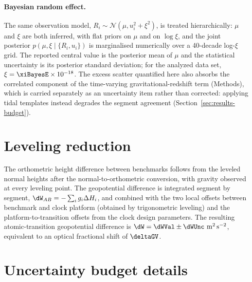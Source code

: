 \paragraph{Bayesian random effect.} The same observation model,
$R_i \sim \mathcal{N}(\mu, u_i^2 + \xi^2)$, is treated
hierarchically: $\mu$ and $\xi$ are both inferred, with flat priors
on $\mu$ and on $\log\xi$, and the joint posterior
$p(\mu, \xi \mid \{R_i, u_i\})$ is marginalised numerically over a
40-decade log-$\xi$ grid. The reported central value is the posterior
mean of $\mu$ and the statistical uncertainty is its posterior
standard deviation; for the analyzed data set,
$\xi = \xiBayesE \times 10^{-18}$. The excess scatter quantified here
also absorbs the correlated component of the time-varying
gravitational-redshift term (Methods), which
is carried separately as an uncertainty item rather than corrected:
applying tidal templates instead degrades the segment agreement
(Section~\ref{sec:results-budget}).

\section{Leveling reduction}
\label{app:leveling}

The orthometric height difference between benchmarks follows from the
leveled normal heights after the normal-to-orthometric conversion,
with gravity observed at every leveling point. The geopotential
difference is integrated segment by segment,
$\dW_{AB} = -\sum_i g_i \Delta H_i$, and combined with the two local
offsets between benchmark and clock platform (obtained by
trigonometric leveling) and the platform-to-transition offsets from
the clock design parameters. The resulting atomic-transition
geopotential difference is $\dW = \dWVal \pm \dWUnc~\mathrm{m^2\,s^{-2}}$,
equivalent to an optical fractional shift of $\deltaGV$.

\section{Uncertainty budget details}
\label{app:budget}

